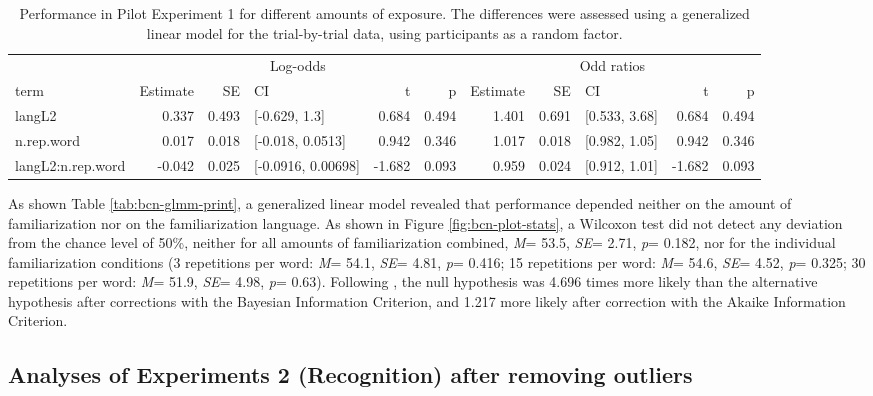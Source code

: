 \documentclass[
]{article}
\newcommand{\p}{{\em p\/}}
\newcommand{\M}{{\em M\/}}
\newcommand{\SE}{{\em SE\/}}
\begin{document}
\begin{longtable}[t]{lrrlrrrrlrr}
\caption{\label{tab:bcn-glmm-print-with-or}Performance in Pilot Experiment 1 for different amounts of exposure. The differences were assessed using a generalized linear model for the trial-by-trial data, using participants as a random factor.}\\
\toprule
\multicolumn{1}{c}{ } & \multicolumn{5}{c}{Log-odds} & \multicolumn{5}{c}{Odd ratios} \\
\cmidrule(l{3pt}r{3pt}){2-6} \cmidrule(l{3pt}r{3pt}){7-11}
term & Estimate & SE & CI & t & p & Estimate & SE & CI & t & p\\
\midrule
langL2 & 0.337 & 0.493 & {}[-0.629, 1.3] & 0.684 & 0.494 & 1.401 & 0.691 & {}[0.533, 3.68] & 0.684 & 0.494\\
n.rep.word & 0.017 & 0.018 & {}[-0.018, 0.0513] & 0.942 & 0.346 & 1.017 & 0.018 & {}[0.982, 1.05] & 0.942 & 0.346\\
langL2:n.rep.word & -0.042 & 0.025 & {}[-0.0916, 0.00698] & -1.682 & 0.093 & 0.959 & 0.024 & {}[0.912, 1.01] & -1.682 & 0.093\\
\bottomrule
\end{longtable}

As shown Table \ref{tab:bcn-glmm-print}, a generalized linear model
revealed that performance depended neither on the amount of
familiarization nor on the familiarization language. As shown in Figure
\ref{fig:bcn-plot-stats}, a Wilcoxon test did not detect any deviation
from the chance level of 50\%, neither for all amounts of
familiarization combined, \M = 53.5, \SE = 2.71, \p = 0.182, nor for the
individual familiarization conditions (3 repetitions per word: \M =
54.1, \SE = 4.81, \p = 0.416; 15 repetitions per word: \M = 54.6, \SE =
4.52, \p = 0.325; 30 repetitions per word: \M = 51.9, \SE = 4.98, \p =
0.63). Following \citet{Glover2004}, the null hypothesis was 4.696 times
more likely than the alternative hypothesis after corrections with the
Bayesian Information Criterion, and 1.217 more likely after correction
with the Akaike Information Criterion.

\clearpage

\subsection{Analyses of Experiments 2 (Recognition) after removing
outliers}\label{analyses-of-experiments-2-recognition-after-removing-outliers}
\end{document}

